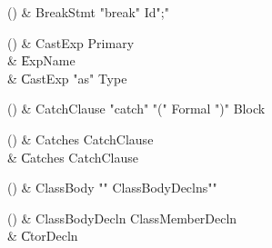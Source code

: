 \begin{bbgrammarappendix}

() & BreakStmt \label{prod:BreakStmt}  \: \xcd"break" Id\opt \xcd";"  \\


\end{bbgrammarappendix}

\begin{bbgrammarappendix}

() & CastExp \label{prod:CastExp}  \: Primary  \\

 &    \| ExpName \\
 &    \| CastExp \xcd"as" Type \\

\end{bbgrammarappendix}

\begin{bbgrammarappendix}

() & CatchClause \label{prod:CatchClause}  \: \xcd"catch" \xcd"(" Formal \xcd")" Block  \\


\end{bbgrammarappendix}

\begin{bbgrammarappendix}

() & Catches \label{prod:Catches}  \: CatchClause  \\

 &    \| Catches CatchClause \\

\end{bbgrammarappendix}

\begin{bbgrammarappendix}

() & ClassBody \label{prod:ClassBody}  \: \xcd"{" ClassBodyDeclns\opt \xcd"}"  \\


\end{bbgrammarappendix}

\begin{bbgrammarappendix}

() & ClassBodyDecln \label{prod:ClassBodyDecln}  \: ClassMemberDecln  \\

 &    \| CtorDecln \\

\end{bbgrammarappendix}

